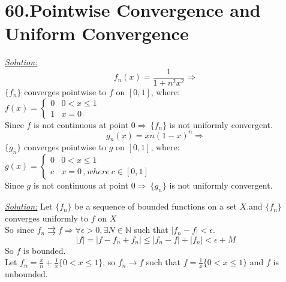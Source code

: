 \documentclass{article}
\begin{document}
\section*{60.Pointwise Convergence and Uniform Convergence}
\begin{tcolorbox}[enhanced,attach boxed title to top center={yshift=-3mm,yshifttext=-1mm},
  colback=black!5!white,colframe=black!75!black,colbacktitle=red!80!black,
  title=Exercise-60.2:.,fonttitle=\bfseries,boxed title style={size=small,colframe=red!50!black} ]
  \textit{ {\color{red}\underline{Solution:}}}
$$f_n (x)=\frac{1}{1+n^2 x^2}\Longrightarrow$$
$\{f_n\}$ converges pointwise to $f$ on $[0,1]$, where:\\
$f(x)=\begin{cases}
0 & 0< x \leq 1\\
1 & x=0
\end{cases}$\\
Since $f$ is not continuous at point $0\Rightarrow~\{f_n\}$ is not uniformly convergent. 
\noindent{\color{black}\rule{\linewidth}{.3mm}}
$$g_n (x)=xn(1-x)^n\Longrightarrow$$
$\{g_n\}$ converges pointwise to $g$ on $[0,1]$, where:\\
$g(x)=\begin{cases}
0 & 0< x \leq 1\\
c & x=0 ~,where~c\in[0,1]
\end{cases}$\\
Since $g$ is not continuous at point $0\Rightarrow~\{g_n\}$ is not uniformly convergent.


\end{tcolorbox}

\begin{tcolorbox}[enhanced,attach boxed title to top center={yshift=-3mm,yshifttext=-1mm},
  colback=black!5!white,colframe=black!75!black,colbacktitle=red!80!black,
  title=Exercise-60.5:.,fonttitle=\bfseries,
  boxed title style={size=small,colframe=red!50!black} ]
  \textit{ {\color{red}\underline{Solution:}}}
Let $\{f_n\}$ be a sequence of bounded functions on a set $X$.and $\{f_n\}$
converges uniformly to $f$ on $X$\\
So since $f_n\rightrightarrows f\Rightarrow\forall\epsilon>0,\exists N\in\mathbb{N}$ such that $|f_n-f|<\epsilon$.\\
$$|f|=|f-f_n+f_n|\leq |f_n-f|+|f_n|<\epsilon+M$$
So $f$ is bounded.\\
\noindent{\color{black}\rule{\linewidth}{.3mm}}
Let $f_n=\frac{x}{n}+\frac{1}{x}\{0<x\leq 1\}$, so $f_n\rightarrow f$ such that $f=\frac{1}{x}\{0<x\leq 1\}$ and $f$ is unbounded.
\end{tcolorbox}
\end{document}
